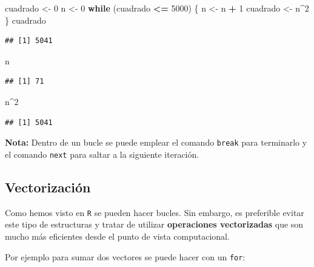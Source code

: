 \documentclass[]{book}
\newenvironment{Shaded}{\begin{snugshade}}{\end{snugshade}}
\newcommand{\DecValTok}[1]{\textcolor[rgb]{0.00,0.00,0.81}{#1}}
\newcommand{\StringTok}[1]{\textcolor[rgb]{0.31,0.60,0.02}{#1}}
\newcommand{\ControlFlowTok}[1]{\textcolor[rgb]{0.13,0.29,0.53}{\textbf{#1}}}
\newcommand{\OperatorTok}[1]{\textcolor[rgb]{0.81,0.36,0.00}{\textbf{#1}}}
\newcommand{\NormalTok}[1]{#1}
\begin{document}
\begin{Shaded}
\begin{Highlighting}[]
\NormalTok{cuadrado <-}\StringTok{ }\DecValTok{0}
\NormalTok{n <-}\StringTok{ }\DecValTok{0}
\ControlFlowTok{while}\NormalTok{ (cuadrado }\OperatorTok{<=}\StringTok{ }\DecValTok{5000}\NormalTok{) \{}
\NormalTok{  n <-}\StringTok{ }\NormalTok{n }\OperatorTok{+}\StringTok{ }\DecValTok{1}
\NormalTok{  cuadrado <-}\StringTok{ }\NormalTok{n}\OperatorTok{^}\DecValTok{2}
\NormalTok{\}}
\NormalTok{cuadrado}
\end{Highlighting}
\end{Shaded}

\begin{verbatim}
## [1] 5041
\end{verbatim}

\begin{Shaded}
\begin{Highlighting}[]
\NormalTok{n}
\end{Highlighting}
\end{Shaded}

\begin{verbatim}
## [1] 71
\end{verbatim}

\begin{Shaded}
\begin{Highlighting}[]
\NormalTok{n}\OperatorTok{^}\DecValTok{2}
\end{Highlighting}
\end{Shaded}

\begin{verbatim}
## [1] 5041
\end{verbatim}

\textbf{Nota:} Dentro de un bucle se puede emplear el comando
\texttt{break} para terminarlo y el comando \texttt{next} para saltar a
la siguiente iteración.

\subsection{Vectorización}\label{vectorizacion}

Como hemos visto en \texttt{R} se pueden hacer bucles. Sin embargo, es
preferible evitar este tipo de estructuras y tratar de utilizar
\textbf{operaciones vectorizadas} que son mucho más eficientes desde el
punto de vista computacional.

Por ejemplo para sumar dos vectores se puede hacer con un \texttt{for}:
\end{document}
